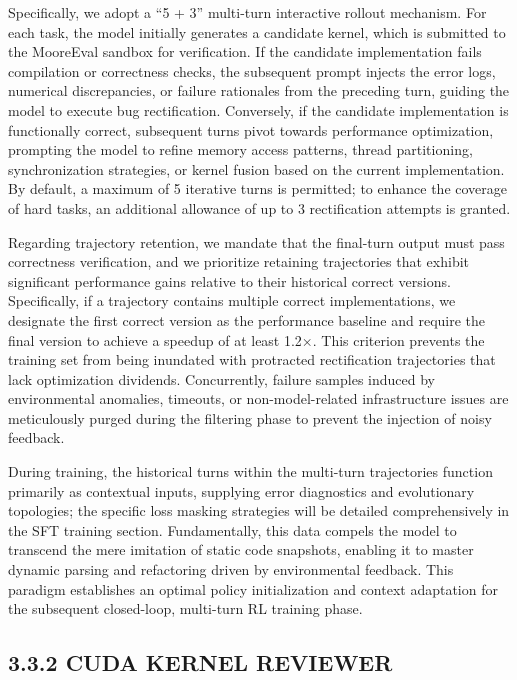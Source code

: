 \documentclass[
  10
]{article}
\begin{document}
Specifically, we adopt a ``5 + 3'' multi-turn interactive rollout
mechanism. For each task, the model initially generates a candidate
kernel, which is submitted to the MooreEval sandbox for verification. If
the candidate implementation fails compilation or correctness checks,
the subsequent prompt injects the error logs, numerical discrepancies,
or failure rationales from the preceding turn, guiding the model to
execute bug rectification. Conversely, if the candidate implementation
is functionally correct, subsequent turns pivot towards performance
optimization, prompting the model to refine memory access patterns,
thread partitioning, synchronization strategies, or kernel fusion based
on the current implementation. By default, a maximum of 5 iterative
turns is permitted; to enhance the coverage of hard tasks, an additional
allowance of up to 3 rectification attempts is granted.

Regarding trajectory retention, we mandate that the final-turn output
must pass correctness verification, and we prioritize retaining
trajectories that exhibit significant performance gains relative to
their historical correct versions. Specifically, if a trajectory
contains multiple correct implementations, we designate the first
correct version as the performance baseline and require the final
version to achieve a speedup of at least 1.2×. This criterion prevents
the training set from being inundated with protracted rectification
trajectories that lack optimization dividends. Concurrently, failure
samples induced by environmental anomalies, timeouts, or
non-model-related infrastructure issues are meticulously purged during
the filtering phase to prevent the injection of noisy feedback.

During training, the historical turns within the multi-turn trajectories
function primarily as contextual inputs, supplying error diagnostics and
evolutionary topologies; the specific loss masking strategies will be
detailed comprehensively in the SFT training section. Fundamentally,
this data compels the model to transcend the mere imitation of static
code snapshots, enabling it to master dynamic parsing and refactoring
driven by environmental feedback. This paradigm establishes an optimal
policy initialization and context adaptation for the subsequent
closed-loop, multi-turn RL training phase.

\subsection{3.3.2 CUDA KERNEL REVIEWER}\label{cuda-kernel-reviewer}
\end{document}
